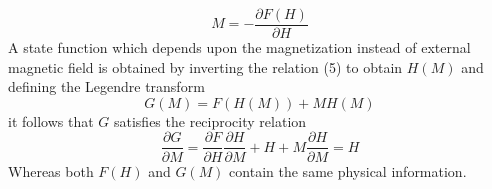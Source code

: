 \documentclass[12pt]{article}
\begin{document}
\begin{equation}
    M=-\frac{\partial F(H)}{\partial H}
\end{equation}
A state function which depends upon the magnetization instead of external 
magnetic field is obtained by inverting the relation (5) to obtain $H(M)$ and 
defining the Legendre transform
\begin{equation*}
    G(M)=F(H(M))+MH(M)
\end{equation*}
it follows that $G$ satisfies the reciprocity relation
\begin{equation*}
    \frac{\partial G}{\partial M}=\frac{\partial F}{\partial H}\frac{\partial H}
    {\partial M}+H+M\frac{\partial H}{\partial M}=H
\end{equation*}
Whereas both $F(H)$ and $G(M)$ contain the same physical information.
\end{document}
